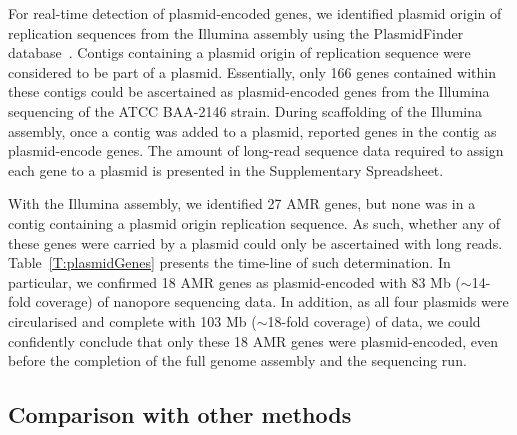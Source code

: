 For real-time detection of plasmid-encoded genes, we identified plasmid origin
of replication sequences from the Illumina assembly using the PlasmidFinder
database~\cite{CarattoliZG2014}. Contigs containing a plasmid origin of
replication sequence were considered to be part of a plasmid. Essentially, only 166
genes contained within these contigs could be ascertained as plasmid-encoded 
genes from the Illumina sequencing of the \kp{} ATCC BAA-2146 strain. During 
scaffolding of the Illumina assembly, once a contig was added to a plasmid,
\npscarf{} reported genes in the contig as plasmid-encode genes. The amount of 
long-read sequence data required to assign each gene to a plasmid is presented in 
the Supplementary Spreadsheet.  

With the Illumina assembly, we identified 27 AMR genes,  but none was in a
contig containing a plasmid origin replication sequence. As such, whether any 
of these genes were carried by a plasmid could only be ascertained with long
reads. Table~\ref{T:plasmidGenes} presents the time-line of such determination.
In particular, we confirmed 18 AMR genes as plasmid-encoded with 83 Mb
($\sim$14-fold coverage) of nanopore sequencing data. In addition, as all four
plasmids were circularised and complete with 103 Mb ($\sim$18-fold coverage) of
data, we could confidently conclude that only these 18 AMR genes were
plasmid-encoded, even before the completion of the full genome assembly and the
sequencing run.

\subsection{Comparison with other methods}

